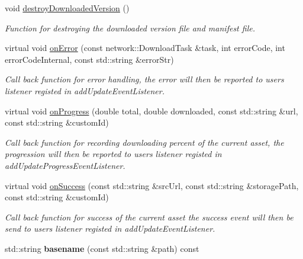 \begin{DoxyCompactItemize}
\mbox{\label{classAssetsManagerEx_a3d03f738e7b48ab5183c5c9aa8b36282}} 
void \hyperlink{classAssetsManagerEx_a3d03f738e7b48ab5183c5c9aa8b36282}{destroy\+Downloaded\+Version} ()
\begin{DoxyCompactList}\small\item\em Function for destroying the downloaded version file and manifest file. \end{DoxyCompactList}\item 
virtual void \hyperlink{classAssetsManagerEx_a66fa811543aef93caff6ce15c8a3ea60}{on\+Error} (const network\+::\+Download\+Task \&task, int error\+Code, int error\+Code\+Internal, const std\+::string \&error\+Str)
\begin{DoxyCompactList}\small\item\em Call back function for error handling, the error will then be reported to user\textquotesingle{}s listener registed in add\+Update\+Event\+Listener. \end{DoxyCompactList}\item 
virtual void \hyperlink{classAssetsManagerEx_ac7bb9bd198851b443ea85735daa9d74a}{on\+Progress} (double total, double downloaded, const std\+::string \&url, const std\+::string \&custom\+Id)
\begin{DoxyCompactList}\small\item\em Call back function for recording downloading percent of the current asset, the progression will then be reported to user\textquotesingle{}s listener registed in add\+Update\+Progress\+Event\+Listener. \end{DoxyCompactList}\item 
virtual void \hyperlink{classAssetsManagerEx_ade8117f87473f739a6ec7d3ad6e4d598}{on\+Success} (const std\+::string \&src\+Url, const std\+::string \&storage\+Path, const std\+::string \&custom\+Id)
\begin{DoxyCompactList}\small\item\em Call back function for success of the current asset the success event will then be send to user\textquotesingle{}s listener registed in add\+Update\+Event\+Listener. \end{DoxyCompactList}\item 
\mbox{\label{classAssetsManagerEx_ac8225cdfddff06576a2feee23acee2a0}} 
std\+::string {\bfseries basename} (const std\+::string \&path) const
\item 
\mbox{\label{classAssetsManagerEx_a00963ee3a1b97fe9db6c173195374726}} 

\end{DoxyCompactItemize}
